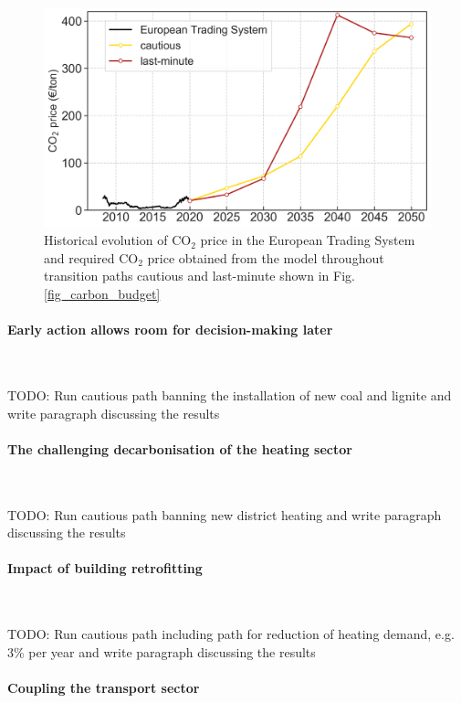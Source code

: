 \documentclass[5p]{elsarticle} %
\begin{document}
\begin{figure}[!h]
\centering
\includegraphics[width=\columnwidth]{figures/co2_price.png}
\caption{Historical evolution of CO$_2$ price in the European Trading System \cite{ETS} and required CO$_2$ price obtained from the model throughout transition paths cautious and last-minute shown in Fig. \ref{fig_carbon_budget}} \label{fig_co2price} 
\end{figure}


\paragraph{\textbf{Early action allows room for decision-making later}} \

\textcolor[rgb]{1,0,0}{TODO: Run cautious path banning the installation of new coal and lignite and write paragraph discussing the results}


\paragraph{\textbf{The challenging decarbonisation of the heating sector}} \

\textcolor[rgb]{1,0,0}{TODO: Run cautious path banning new district heating and write paragraph discussing the results}

\paragraph{\textbf{Impact of building retrofitting}} \

\textcolor[rgb]{1,0,0}{TODO: Run cautious path including path for reduction of heating demand, e.g. 3\% per year and write paragraph discussing the results}

\paragraph{\textbf{Coupling the transport sector}} \
\end{document}
